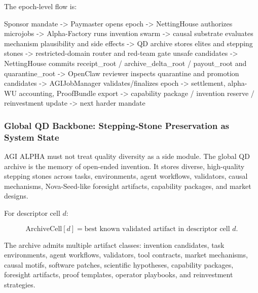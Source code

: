 \documentclass[
  11pt,
]{article}
\newenvironment{Shaded}{}{}
\newcommand{\NormalTok}[1]{#1}
\begin{document}
The epoch-level flow is:

\begin{Shaded}
\begin{Highlighting}[]
\NormalTok{Sponsor mandate}
\NormalTok{{-}\textgreater{} Paymaster opens epoch}
\NormalTok{{-}\textgreater{} NettingHouse authorizes microjobs}
\NormalTok{{-}\textgreater{} Alpha{-}Factory runs invention swarm}
\NormalTok{{-}\textgreater{} causal substrate evaluates mechanism plausibility and side effects}
\NormalTok{{-}\textgreater{} QD archive stores elites and stepping stones}
\NormalTok{{-}\textgreater{} restricted{-}domain router and red{-}team gate unsafe candidates}
\NormalTok{{-}\textgreater{} NettingHouse commits receipt\_root / archive\_delta\_root / payout\_root}
\NormalTok{   and quarantine\_root}
\NormalTok{{-}\textgreater{} OpenClaw reviewer inspects quarantine and promotion candidates}
\NormalTok{{-}\textgreater{} AGIJobManager validates/finalizes epoch}
\NormalTok{{-}\textgreater{} settlement, alpha{-}WU accounting, ProofBundle export}
\NormalTok{{-}\textgreater{} capability package / invention reserve / reinvestment update}
\NormalTok{{-}\textgreater{} next harder mandate}
\end{Highlighting}
\end{Shaded}

\subsubsection{Global QD Backbone: Stepping-Stone Preservation as System
State}\label{global-qd-backbone-stepping-stone-preservation-as-system-state}

AGI ALPHA must not treat quality diversity as a side module. The global
QD archive is the memory of open-ended invention. It stores diverse,
high-quality stepping stones across tasks, environments, agent
workflows, validators, causal mechanisms, Nova-Seed-like foresight
artifacts, capability packages, and market designs.

For descriptor cell \(d\):

\[
\mathrm{ArchiveCell}[d]
=
\text{best known validated artifact in descriptor cell } d.
\]

The archive admits multiple artifact classes: invention candidates, task
environments, agent workflows, validators, tool contracts, market
mechanisms, causal motifs, software patches, scientific hypotheses,
capability packages, foresight artifacts, proof templates, operator
playbooks, and reinvestment strategies.
\end{document}
